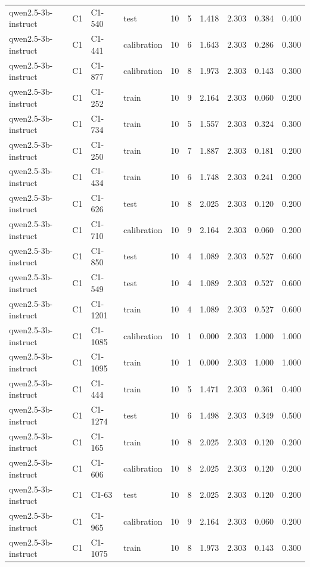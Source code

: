 \begin{table}
\begin{tabular}{llllrrrrrr}
qwen2.5-3b-instruct & C1 & C1-540 & test & 10 & 5 & 1.418 & 2.303 & 0.384 & 0.400 \\
qwen2.5-3b-instruct & C1 & C1-441 & calibration & 10 & 6 & 1.643 & 2.303 & 0.286 & 0.300 \\
qwen2.5-3b-instruct & C1 & C1-877 & calibration & 10 & 8 & 1.973 & 2.303 & 0.143 & 0.300 \\
qwen2.5-3b-instruct & C1 & C1-252 & train & 10 & 9 & 2.164 & 2.303 & 0.060 & 0.200 \\
qwen2.5-3b-instruct & C1 & C1-734 & train & 10 & 5 & 1.557 & 2.303 & 0.324 & 0.300 \\
qwen2.5-3b-instruct & C1 & C1-250 & train & 10 & 7 & 1.887 & 2.303 & 0.181 & 0.200 \\
qwen2.5-3b-instruct & C1 & C1-434 & train & 10 & 6 & 1.748 & 2.303 & 0.241 & 0.200 \\
qwen2.5-3b-instruct & C1 & C1-626 & test & 10 & 8 & 2.025 & 2.303 & 0.120 & 0.200 \\
qwen2.5-3b-instruct & C1 & C1-710 & calibration & 10 & 9 & 2.164 & 2.303 & 0.060 & 0.200 \\
qwen2.5-3b-instruct & C1 & C1-850 & test & 10 & 4 & 1.089 & 2.303 & 0.527 & 0.600 \\
qwen2.5-3b-instruct & C1 & C1-549 & test & 10 & 4 & 1.089 & 2.303 & 0.527 & 0.600 \\
qwen2.5-3b-instruct & C1 & C1-1201 & train & 10 & 4 & 1.089 & 2.303 & 0.527 & 0.600 \\
qwen2.5-3b-instruct & C1 & C1-1085 & calibration & 10 & 1 & 0.000 & 2.303 & 1.000 & 1.000 \\
qwen2.5-3b-instruct & C1 & C1-1095 & train & 10 & 1 & 0.000 & 2.303 & 1.000 & 1.000 \\
qwen2.5-3b-instruct & C1 & C1-444 & train & 10 & 5 & 1.471 & 2.303 & 0.361 & 0.400 \\
qwen2.5-3b-instruct & C1 & C1-1274 & test & 10 & 6 & 1.498 & 2.303 & 0.349 & 0.500 \\
qwen2.5-3b-instruct & C1 & C1-165 & train & 10 & 8 & 2.025 & 2.303 & 0.120 & 0.200 \\
qwen2.5-3b-instruct & C1 & C1-606 & calibration & 10 & 8 & 2.025 & 2.303 & 0.120 & 0.200 \\
qwen2.5-3b-instruct & C1 & C1-63 & test & 10 & 8 & 2.025 & 2.303 & 0.120 & 0.200 \\
qwen2.5-3b-instruct & C1 & C1-965 & calibration & 10 & 9 & 2.164 & 2.303 & 0.060 & 0.200 \\
qwen2.5-3b-instruct & C1 & C1-1075 & train & 10 & 8 & 1.973 & 2.303 & 0.143 & 0.300 \\

\end{tabular}
\end{table}
